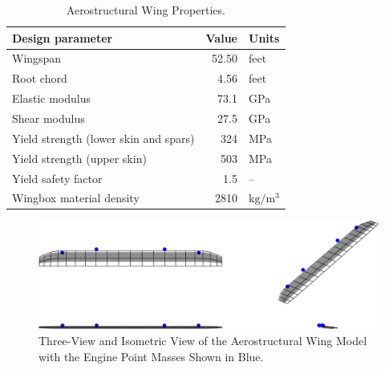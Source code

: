 \begin{table}[!htb]
 \normalsize
 \begin{center}
  \caption{Aerostructural Wing Properties.}
  \label{t:aerostruct_wing}
    \begin{tabular}{ l r l }
        \hline
        \textbf{Design parameter} & \textbf{Value} & \textbf{Units} \\
        \hline
        Wingspan & 52.50 & feet \\
        Root chord & 4.56 & feet \\
        Elastic modulus & 73.1 & GPa \\
        Shear modulus & 27.5 & GPa \\
        Yield strength (lower skin and spars) & 324 & MPa \\
        Yield strength (upper skin) & 503 & MPa \\
        Yield safety factor & 1.5 & -- \\
        Wingbox material density & 2810 & $\text{kg}/\text{m}^3$ \\
        \hline
    \end{tabular}
 \end{center}
\end{table}

\begin{figure}[h]
\begin{center}
 \includegraphics[width=1.0\textwidth]{../Images/aerostruct_wing}
 \caption{Three-View and Isometric View of the Aerostructural Wing Model with the Engine Point Masses Shown in Blue.}
 \label{f:OAS_wing}
\end{center}
\end{figure}

